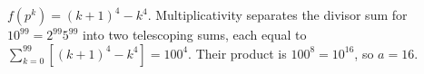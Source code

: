 $f(p^k)=(k+1)^4-k^4$. Multiplicativity separates the divisor sum for $10^{99}=2^{99}5^{99}$ into two telescoping sums, each equal to $\sum_{k=0}^{99}[(k+1)^4-k^4]=100^4$. Their product is $100^8=10^{16}$, so $\boxed{a=16}$.
